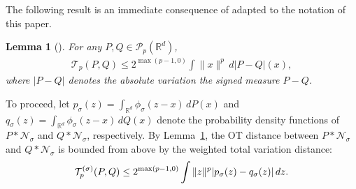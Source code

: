 \documentclass{article}
\newtheorem{lemma}[theorem]{Lemma}
\theoremstyle{definition}
\newcommand{\reals}{\mathbb{R}}
\newcommand{\normal}{\mathcal{N}}
\newcommand{\cP}{\mathcal{P}}
\newcommand{\cT}{\mathcal{T}}
\let\originalleft\left
\let\originalright\right
\renewcommand{\left}{\mathopen{}\mathclose\bgroup\originalleft}
\renewcommand{\right}{\aftergroup\egroup\originalright}
\begin{document}
The following result is an immediate consequence of \cite[Theorem~6.13]{villani2008optimal} adapted to the notation of this paper. 

\begin{lemma}[{\cite[Theorem~6.13]{villani2008optimal}}]\label{lem:TVbnd}
For any $P, Q \in \cP_p(\reals^d)$, 
\begin{align}
    \cT_p(P,Q) \le 2^{\max(p-1,0)} \int \|x\|^p\, d|P - Q|(x),
\end{align}
where $|P-Q|$ denotes the absolute variation the signed measure $P-Q$.
\end{lemma}




To proceed, let $p_\sigma(z) = \int_{\reals^d} \phi_{\sigma}(z -x) \, dP(x)$ and $ q_\sigma(z) = \int_{\reals^d} \phi_{\sigma}(z -x) \, dQ(x)$ denote the probability density functions of $P \ast \normal_\sigma$ and $Q \ast \normal_\sigma$, respectively.  By Lemma~\ref{lem:TVbnd}, the OT distance between $P\ast \normal_\sigma$ and $Q \ast \normal_\sigma$ is bounded from above by the weighted total variation distance:
\begin{align}
\cT^{(\sigma)}_{p}(P,Q) \le 2^{\max(p-1,0)} \int \|z\|^p\left|  p_\sigma(z) - q_{\sigma}(z) \right| \, dz. \label{seq:TVbnd}
\end{align}
\end{document}
